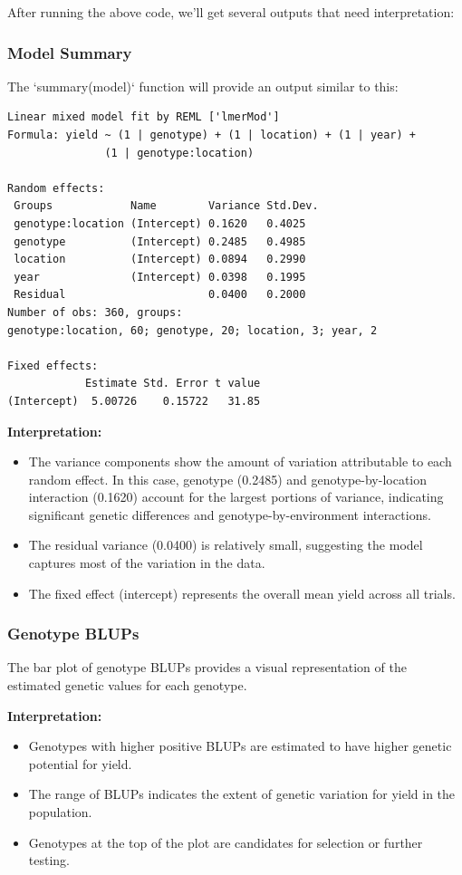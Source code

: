 \documentclass[12pt,a4paper]{article}
\begin{document}
After running the above code, we'll get several outputs that need interpretation:

\subsubsection{Model Summary}

The `summary(model)` function will provide an output similar to this:

\begin{verbatim}
Linear mixed model fit by REML ['lmerMod']
Formula: yield ~ (1 | genotype) + (1 | location) + (1 | year) + 
               (1 | genotype:location)

Random effects:
 Groups            Name        Variance Std.Dev.
 genotype:location (Intercept) 0.1620   0.4025  
 genotype          (Intercept) 0.2485   0.4985  
 location          (Intercept) 0.0894   0.2990  
 year              (Intercept) 0.0398   0.1995  
 Residual                      0.0400   0.2000  
Number of obs: 360, groups:  
genotype:location, 60; genotype, 20; location, 3; year, 2

Fixed effects:
            Estimate Std. Error t value
(Intercept)  5.00726    0.15722   31.85
\end{verbatim}

\textbf{Interpretation:}
\begin{itemize}
    \item The variance components show the amount of variation attributable to each random effect. In this case, genotype (0.2485) and genotype-by-location interaction (0.1620) account for the largest portions of variance, indicating significant genetic differences and genotype-by-environment interactions.
    \item The residual variance (0.0400) is relatively small, suggesting the model captures most of the variation in the data.
    \item The fixed effect (intercept) represents the overall mean yield across all trials.
\end{itemize}

\subsubsection{Genotype BLUPs}

The bar plot of genotype BLUPs provides a visual representation of the estimated genetic values for each genotype.

\textbf{Interpretation:}
\begin{itemize}
    \item Genotypes with higher positive BLUPs are estimated to have higher genetic potential for yield.
    \item The range of BLUPs indicates the extent of genetic variation for yield in the population.
    \item Genotypes at the top of the plot are candidates for selection or further testing.
\end{itemize}
\end{document}
